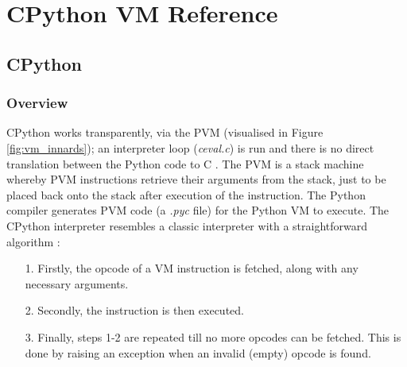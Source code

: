 \chapter{CPython VM Reference}
\label{chap:cpythonvmref}
\section{CPython}
		\subsection{Overview}
		\par CPython works transparently, via the \acs{PVM} (visualised in Figure \ref{fig:vm_innards}); an interpreter loop (\textit{ceval.c}) is run and there is no direct translation between the Python code to C \cite[pp.1--2]{aycock1998converting}. 
		The \acs{PVM} is a stack machine whereby \acs{PVM} instructions retrieve their arguments from the stack, just to be placed back onto the stack after execution of the instruction. The Python compiler generates \acs{PVM} code (a \textit{.pyc} file) for the Python \acs{VM} to execute.
		The CPython interpreter resembles a classic interpreter with a straightforward algorithm \cite[pp.2--4]{aycock1998converting}: 
		\begin{itemize}
			\item[1.] Firstly, the opcode of a VM instruction is fetched, along with any necessary arguments.
			\item[2.] Secondly, the instruction is then executed.
			\item[3.] Finally, steps 1-2 are repeated till no more opcodes can be fetched. This is done by raising an exception when an invalid (empty) opcode is found.  
		\end{itemize}

